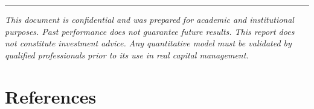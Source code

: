 \documentclass[11pt,a4paper]{article}
\begin{document}
\vspace{1cm}
{\color{accentgold}\rule{\linewidth}{0.6pt}}
\begin{center}
\small\color{darkgray}
\textit{This document is confidential and was prepared for academic and institutional purposes.
Past performance does not guarantee future results. This report does not constitute investment advice.
Any quantitative model must be validated by qualified professionals prior to its use in real capital management.}
\end{center}


\newpage
\section{References}
\end{document}
